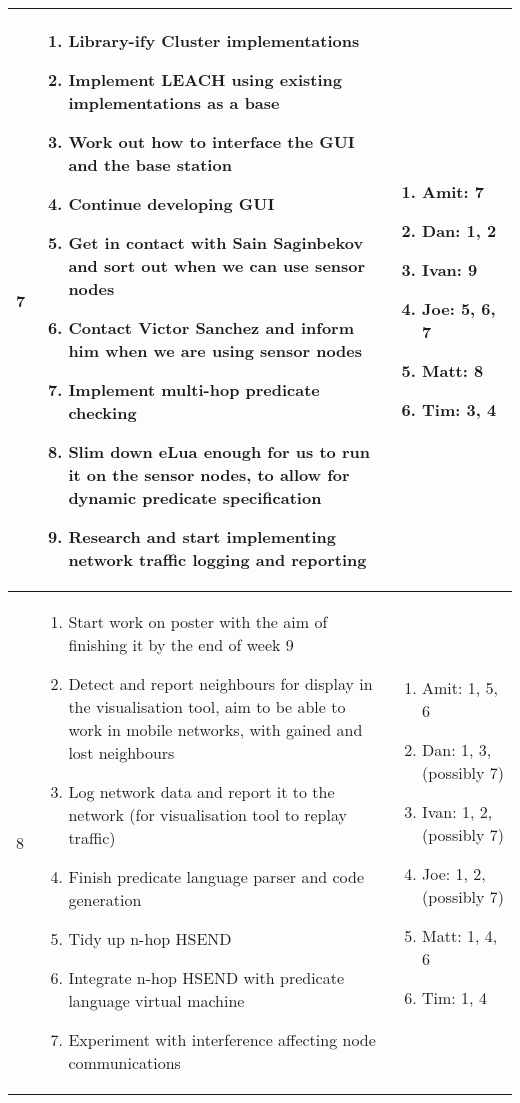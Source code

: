 \begin{center}
\begin{longtable}{| l | p{7.5cm} | p{5cm} |}
	7 & \begin{enumerate}
			\item Library-ify Cluster implementations
			\item Implement LEACH  using existing implementations as a base
			\item Work out how to interface the GUI and the base station
			\item Continue developing GUI
			\item Get in contact with Sain Saginbekov and sort out when we can use sensor nodes
			\item Contact Victor Sanchez and inform him when we are using sensor nodes
			\item Implement multi-hop predicate checking
			\item Slim down eLua enough for us to run it on the sensor nodes, to allow for dynamic predicate specification
			\item Research and start implementing network traffic logging and reporting
		\end{enumerate} &
	\begin{enumerate}
		\item[] Amit: 7
		\item[] Dan: 1, 2
		\item[] Ivan: 9
		\item[] Joe: 5, 6, 7
		\item[] Matt: 8
		\item[] Tim: 3, 4
	\end{enumerate}
	\\ \hline
	
	8 & \begin{enumerate}
			\item Start work on poster with the aim of finishing it by the end of week 9
			\item Detect and report neighbours for display in the visualisation tool, aim to be able to work in mobile networks, with gained and lost neighbours
			\item Log network data and report it to the network (for visualisation tool to replay traffic)
			\item Finish predicate language parser and code generation
			\item Tidy up n-hop HSEND
			\item Integrate n-hop HSEND with predicate language virtual machine
			\item Experiment with interference affecting node communications
		\end{enumerate} &
	\begin{enumerate}
		\item[] Amit: 1, 5, 6
		\item[] Dan: 1, 3, (possibly 7)
		\item[] Ivan: 1, 2, (possibly 7)
		\item[] Joe: 1, 2, (possibly 7)
		\item[] Matt: 1, 4, 6
		\item[] Tim: 1, 4
	\end{enumerate}
	\\ \hline


\end{longtable}
\end{center}
